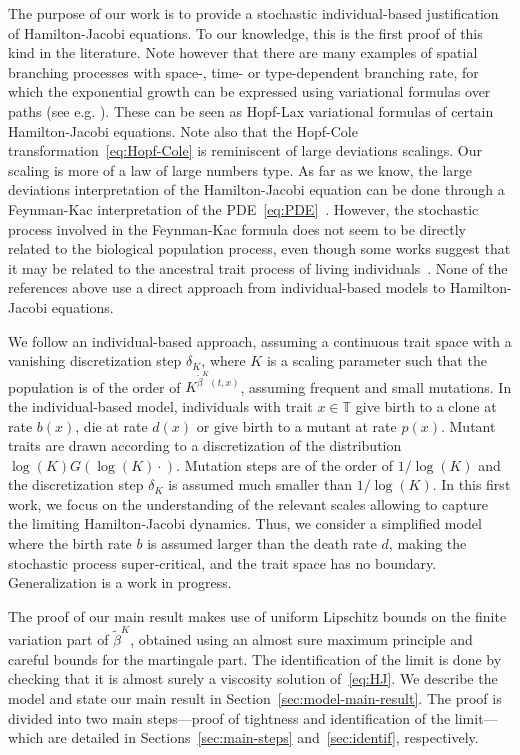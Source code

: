 \documentclass[10pt]{amsart}
\theoremstyle{plain}
\theoremstyle{remark}
\begin{document}
The purpose of our work is to provide a stochastic individual-based justification of Hamilton-Jacobi equations. To our knowledge, this is the first proof of this kind in the literature. Note however that there are many examples of spatial branching processes with space-, time- or type-dependent branching rate, for which the exponential growth can be expressed using variational formulas over paths (see e.g. \cite{biggins,berestyckibrunetharrisharrisroberts,callegaroroberts,mallein,maillardraoultourniaire}). These can be seen as Hopf-Lax variational formulas of certain Hamilton-Jacobi equations.
Note also that the Hopf-Cole transformation~\eqref{eq:Hopf-Cole} is reminiscent of large deviations scalings. Our scaling is more of a law of large numbers type. As far as we know, the large deviations interpretation of the Hamilton-Jacobi equation can be done through a Feynman-Kac interpretation of the PDE~\eqref{eq:PDE}~\cite{Champagnat-Henry-2019}. However, the stochastic process involved in the Feynman-Kac formula does not seem to be directly related to the biological population process, even though some works suggest that it may be related to the ancestral trait process of living individuals~\cite{foriengarnierpatout}. None of the references above use a direct approach from individual-based models to Hamilton-Jacobi equations.

We follow an individual-based approach, assuming a continuous trait space with a vanishing discretization step $\delta_K$, where $K$ is a scaling parameter such that the population is of the order of $K^{\widetilde{\beta}^K(t,x)}$, assuming frequent and small mutations. In the individual-based model, individuals with trait $x\in\mathbb{T}$ give birth to a clone at rate $b(x)$, die at rate $d(x)$ or give birth to a mutant at rate $p(x)$. Mutant traits are drawn according to a discretization of the distribution $\log (K) G(\log (K) \cdot)$. Mutation steps are of the order of $1/\log (K)$ and the discretization step $\delta_K$ is assumed much smaller than $1/\log (K)$. In this first work, we focus on the understanding of the relevant scales allowing to capture the limiting Hamilton-Jacobi dynamics. Thus, we consider a simplified model where the birth rate $b$ is assumed larger than the death rate $d$, making the stochastic process super-critical, and the trait space has no boundary. Generalization is a work in progress.

The proof of our main result makes use of uniform Lipschitz bounds on the finite variation part of $\widetilde{\beta}^K$, obtained using an almost sure maximum principle and careful bounds for the martingale part. The identification of the limit is done by checking that it is almost surely a viscosity solution of~\eqref{eq:HJ}. We describe the model and state our main result in Section~\ref{sec:model-main-result}. The proof is divided into two main steps---proof of tightness and identification of the limit---which are detailed in Sections~\ref{sec:main-steps} and~\ref{sec:identif}, respectively.
\end{document}
